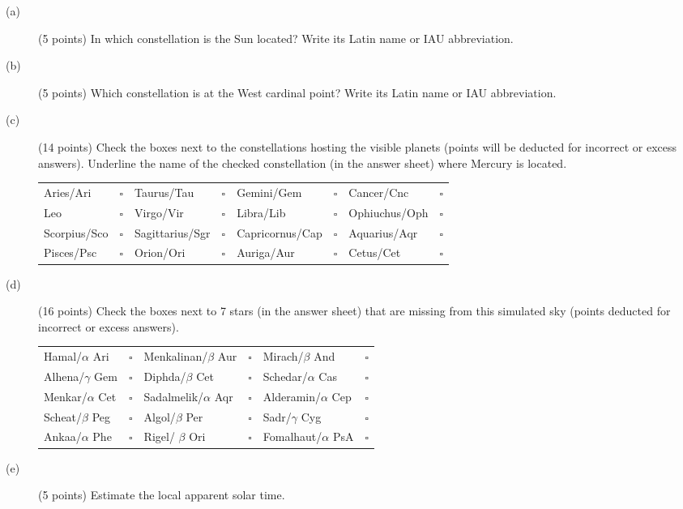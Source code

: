 \begin{description}
\item[(a)] (5 points) In which constellation is the Sun located? Write its
  Latin name or IAU abbreviation.
\item[(b)] (5 points) Which constellation is at the West cardinal point? Write
  its Latin name or IAU abbreviation.
\item[(c)] (14 points) Check the boxes next to the constellations hosting the
  visible planets (points will be deducted for incorrect or excess answers).
  Underline the name of the checked constellation (in the answer sheet) where
  Mercury is located.

  \begin{center}
  \begin{tabular}{l@{\ }c@{\qquad}l@{\ }c@{\qquad}l@{\ }c@{\qquad}l@{\ }c}
  Aries/Ari & $\square$ & Taurus/Tau & $\square$ & Gemini/Gem & $\square$ & Cancer/Cnc & $\square$ \\
  Leo & $\square$ & Virgo/Vir & $\square$ & Libra/Lib & $\square$ & Ophiuchus/Oph & $\square$ \\
  Scorpius/Sco & $\square$ & Sagittarius/Sgr & $\square$ & Capricornus/Cap & $\square$ & Aquarius/Aqr & $\square$ \\
  Pisces/Psc & $\square$ & Orion/Ori & $\square$ & Auriga/Aur & $\square$ & Cetus/Cet & $\square$ \\
  \end{tabular}
  \end{center}

\item[(d)] (16 points) Check the boxes next to 7 stars (in the answer sheet)
  that are missing from this simulated sky (points deducted for incorrect or
  excess answers).

  \begin{center}
  \begin{tabular}{l@{\ }c@{\qquad}l@{\ }c@{\qquad}l@{\ }c}
  Hamal/$\alpha$ Ari & $\square$ & Menkalinan/$\beta$ Aur & $\square$ & Mirach/$\beta$ And & $\square$ \\
  Alhena/$\gamma$ Gem & $\square$ & Diphda/$\beta$ Cet & $\square$ & Schedar/$\alpha$ Cas & $\square$ \\
  Menkar/$\alpha$ Cet & $\square$ & Sadalmelik/$\alpha$ Aqr & $\square$ & Alderamin/$\alpha$ Cep & $\square$ \\
  Scheat/$\beta$ Peg & $\square$ & Algol/$\beta$ Per & $\square$ & Sadr/$\gamma$ Cyg & $\square$ \\
  Ankaa/$\alpha$ Phe & $\square$ & Rigel/ $\beta$ Ori & $\square$ & Fomalhaut/$\alpha$ PsA & $\square$ \\
  \end{tabular}
  \end{center}

\item[(e)] (5 points) Estimate the local apparent solar time.
\end{description}

